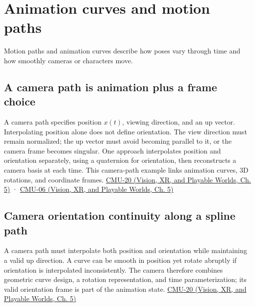 \section{Animation curves and motion paths}\label{04-visual-computing-ii-ch029-animation-curves-and-motion-paths}

Motion paths and animation curves describe how poses vary through time and how smoothly cameras or characters move.

\subsection{A camera path is animation plus a frame choice}\label{04-visual-computing-ii-ch029-a-camera-path-is-animation-plus-a-frame-choice}

A camera path specifies position \(x(t)\), viewing direction, and an up vector. Interpolating position alone does not define orientation. The view direction must remain normalized; the up vector must avoid becoming parallel to it, or the camera frame becomes singular. One approach interpolates position and orientation separately, using a quaternion for orientation, then reconstructs a camera basis at each time. This camera-path example links animation curves, 3D rotations, and coordinate frames. \href{../07-Vision-XR-and-Playable-Worlds/main.pdf\#nameddest=04-visual-computing-ii-ch036-cmu-20---introduction-to-animation}{CMU-20 (Vision, XR, and Playable Worlds, Ch. 5)} · \href{../07-Vision-XR-and-Playable-Worlds/main.pdf\#nameddest=04-visual-computing-ii-ch036-cmu-06---3d-rotations-and-complex-representations}{CMU-06 (Vision, XR, and Playable Worlds, Ch. 5)}

\subsection{Camera orientation continuity along a spline path}\label{04-visual-computing-ii-ch029-camera-orientation-continuity-along-a-spline-path}

A camera path must interpolate both position and orientation while maintaining a valid up direction. A curve can be smooth in position yet rotate abruptly if orientation is interpolated inconsistently. The camera therefore combines geometric curve design, a rotation representation, and time parameterization; its valid orientation frame is part of the animation state. \href{../07-Vision-XR-and-Playable-Worlds/main.pdf\#nameddest=04-visual-computing-ii-ch036-cmu-20---introduction-to-animation}{CMU-20 (Vision, XR, and Playable Worlds, Ch. 5)}


